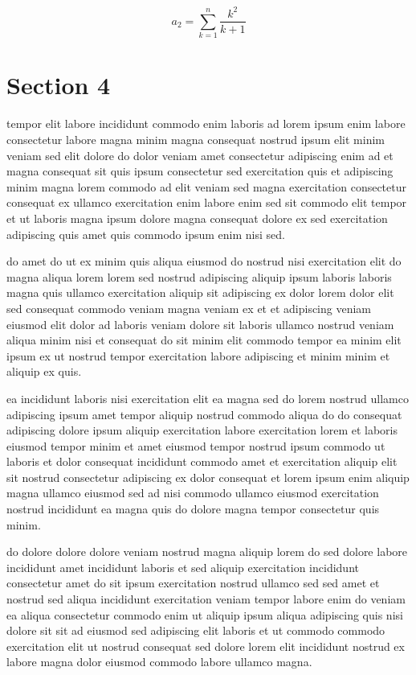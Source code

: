 \documentclass{article}
\begin{document}
\begin{equation} a_{2} = \sum_{k=1}^{n} \frac{k^2}{k+1} \end{equation}
\section{Section 4}
tempor elit labore incididunt commodo enim laboris ad lorem ipsum enim labore consectetur labore magna minim magna consequat nostrud ipsum elit minim veniam sed elit dolore do dolor veniam amet consectetur adipiscing enim ad et magna consequat sit quis ipsum consectetur sed exercitation quis et adipiscing minim magna lorem commodo ad elit veniam sed magna exercitation consectetur consequat ex ullamco exercitation enim labore enim sed sit commodo elit tempor et ut laboris magna ipsum dolore magna consequat dolore ex sed exercitation adipiscing quis amet quis commodo ipsum enim nisi sed.

do amet do ut ex minim quis aliqua eiusmod do nostrud nisi exercitation elit do magna aliqua lorem lorem sed nostrud adipiscing aliquip ipsum laboris laboris magna quis ullamco exercitation aliquip sit adipiscing ex dolor lorem dolor elit sed consequat commodo veniam magna veniam ex et et adipiscing veniam eiusmod elit dolor ad laboris veniam dolore sit laboris ullamco nostrud veniam aliqua minim nisi et consequat do sit minim elit commodo tempor ea minim elit ipsum ex ut nostrud tempor exercitation labore adipiscing et minim minim et aliquip ex quis.

ea incididunt laboris nisi exercitation elit ea magna sed do lorem nostrud ullamco adipiscing ipsum amet tempor aliquip nostrud commodo aliqua do do consequat adipiscing dolore ipsum aliquip exercitation labore exercitation lorem et laboris eiusmod tempor minim et amet eiusmod tempor nostrud ipsum commodo ut laboris et dolor consequat incididunt commodo amet et exercitation aliquip elit sit nostrud consectetur adipiscing ex dolor consequat et lorem ipsum enim aliquip magna ullamco eiusmod sed ad nisi commodo ullamco eiusmod exercitation nostrud incididunt ea magna quis do dolore magna tempor consectetur quis minim.

do dolore dolore dolore veniam nostrud magna aliquip lorem do sed dolore labore incididunt amet incididunt laboris et sed aliquip exercitation incididunt consectetur amet do sit ipsum exercitation nostrud ullamco sed sed amet et nostrud sed aliqua incididunt exercitation veniam tempor labore enim do veniam ea aliqua consectetur commodo enim ut aliquip ipsum aliqua adipiscing quis nisi dolore sit sit ad eiusmod sed adipiscing elit laboris et ut commodo commodo exercitation elit ut nostrud consequat sed dolore lorem elit incididunt nostrud ex labore magna dolor eiusmod commodo labore ullamco magna.
\end{document}
